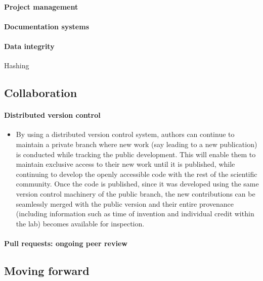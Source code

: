\documentclass[ChapterTOCs,krantz2]{krantz} %
\begin{document}
\paragraph{ {\bf Project management}}

\paragraph{ {\bf Documentation systems}}

\paragraph{ {\bf Data integrity}}

Hashing


\subsection{Collaboration}

\paragraph{ {\bf Distributed version control}}

\begin{itemize}
\item By using a distributed version control system, authors can continue
to maintain a private branch where new work (say leading to a new
publication) is conducted while tracking the public development. This
will enable them to maintain exclusive access to their new work until
it is published, while continuing to develop the openly accessible
code with the rest of the scientific community. Once the code is published,
since it was developed using the same version control machinery of
the public branch, the new contributions can be seamlessly merged
with the public version and their entire provenance (including information
such as time of invention and individual credit within the lab) becomes
available for inspection.
\end{itemize}

\paragraph{ {\bf Pull requests: ongoing peer review}}

\subsection{Moving forward }
\end{document}
